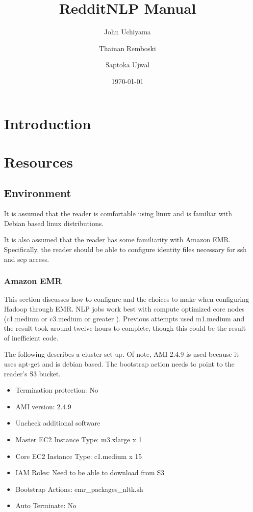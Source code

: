 \documentclass[12pt,a4paper]{article}
\begin{document}
\lstset{breaklines=true}

\title{RedditNLP Manual}
\author{John Uchiyama \and Thainan Remboski \and Saptoka Ujwal}
\date{\today}
\maketitle

\tableofcontents

\newpage

\section{Introduction}

\section{Resources}

\subsection{Environment}

It is assumed that the reader is comfortable
using linux and is familiar with Debian 
based linux distributions.

It is also assumed that the reader has some
familiarity with Amazon EMR. Specifically,
the reader should be able to configure
identity files necessary for ssh and scp
access.

\subsubsection{Amazon EMR}

This section discusses how to configure and the choices
to make when configuring Hadoop through EMR. NLP jobs work
best with compute optimized core nodes (c1.medium or c3.medium or greater ).
Previous attempts used m1.medium and the result took around twelve hours
to complete, though this could be the result of inefficient code.

The following describes a cluster set-up. Of note, AMI 2.4.9 is used
because it uses apt-get and is debian based. The bootstrap
action needs to point to the reader's S3 bucket.

\begin{itemize}
	\item Termination protection: No
	\item AMI version: 2.4.9
	\item Uncheck additional software
	\item Master EC2 Instance Type: m3.xlarge x 1
	\item Core EC2 Instance Type: c1.medium  x 15
	\item IAM Roles: Need to be able to download from S3
	\item Bootstrap Actions: emr\_packages\_nltk.sh
	\item Auto Terminate: No
\end{itemize}
\end{document}
